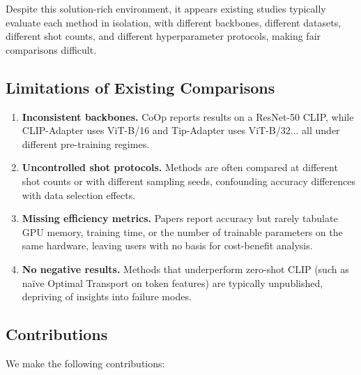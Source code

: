 \documentclass[10pt,twocolumn,letterpaper]{article}
\begin{document}
Despite this solution-rich environment, it appears existing studies typically evaluate each method in isolation, with different backbones, different datasets, different shot counts, and different hyperparameter protocols, making fair comparisons
difficult.


\subsection{Limitations of Existing Comparisons}

\begin{enumerate}
  \item \textbf{Inconsistent backbones.} CoOp reports results on a ResNet-50 CLIP, while CLIP-Adapter uses ViT-B/16 and Tip-Adapter uses ViT-B/32... all under different pre-training regimes.
  
  \item \textbf{Uncontrolled shot protocols.} Methods are often compared at different shot counts or with different sampling seeds, confounding accuracy differences with data selection effects.
  
  \item \textbf{Missing efficiency metrics.} Papers report accuracy but rarely tabulate GPU memory, training time, or the number of trainable parameters on the same hardware, leaving users with no basis for cost-benefit analysis.
  
  \item \textbf{No negative results.}  Methods that underperform zero-shot CLIP (such as naïve Optimal Transport on token features) are typically unpublished, depriving of insights into failure modes.
\end{enumerate}


\subsection{Contributions}

We make the following contributions:
\end{document}
